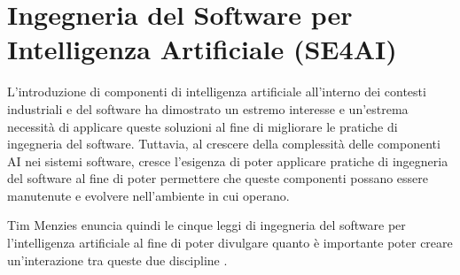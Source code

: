 \section{Ingegneria del Software per Intelligenza Artificiale (SE4AI)}
\label{sec:se4ai}
L'introduzione di componenti di intelligenza artificiale all'interno dei contesti industriali e del software ha dimostrato un estremo interesse e un'estrema necessità di applicare queste soluzioni al fine di migliorare le pratiche di ingegneria del software.
Tuttavia, al crescere della complessità delle componenti AI nei sistemi software, cresce l'esigenza di poter applicare pratiche di ingegneria del software al fine di poter permettere che queste componenti possano essere manutenute e evolvere nell'ambiente in cui operano.

Tim Menzies enuncia quindi le cinque leggi di ingegneria del software per l'intelligenza artificiale al fine di poter divulgare quanto è importante poter creare un'interazione tra queste due discipline \cite{MenziesLaws2020}.
